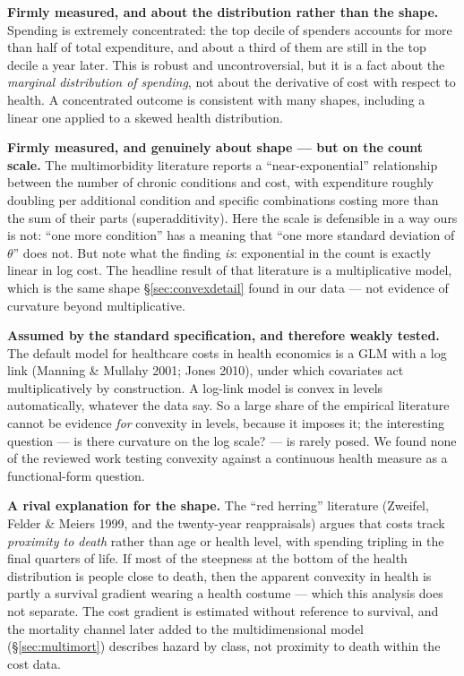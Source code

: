 \documentclass[11pt]{article}
\begin{document}
\textbf{Firmly measured, and about the distribution rather than the shape.}
Spending is extremely concentrated: the top decile of spenders accounts for
more than half of total expenditure, and about a third of them are still in
the top decile a year later. This is robust and uncontroversial, but it is a
fact about the \emph{marginal distribution of spending}, not about the
derivative of cost with respect to health. A concentrated outcome is
consistent with many shapes, including a linear one applied to a skewed
health distribution.

\textbf{Firmly measured, and genuinely about shape --- but on the count
scale.} The multimorbidity literature reports a ``near-exponential''
relationship between the number of chronic conditions and cost, with
expenditure roughly doubling per additional condition and specific
combinations costing more than the sum of their parts (superadditivity).
Here the scale is defensible in a way ours is not: ``one more condition'' has
a meaning that ``one more standard deviation of $\theta$'' does not. But note
what the finding \emph{is}: exponential in the count is exactly linear in log
cost. The headline result of that literature is a multiplicative model, which
is the same shape \S\ref{sec:convexdetail} found in our data --- not evidence
of curvature beyond multiplicative.

\textbf{Assumed by the standard specification, and therefore weakly tested.}
The default model for healthcare costs in health economics is a GLM with a
log link (Manning \& Mullahy 2001; Jones 2010), under which covariates act
multiplicatively by construction. A log-link model is convex in levels
automatically, whatever the data say. So a large share of the empirical
literature cannot be evidence \emph{for} convexity in levels, because it
imposes it; the interesting question --- is there curvature on the log scale?
--- is rarely posed. We found none of the reviewed work testing convexity
against a continuous health measure as a functional-form question.

\textbf{A rival explanation for the shape.} The ``red herring'' literature
(Zweifel, Felder \& Meiers 1999, and the twenty-year reappraisals) argues
that costs track \emph{proximity to death} rather than age or health level,
with spending tripling in the final quarters of life. If most of the
steepness at the bottom of the health distribution is people close to death,
then the apparent convexity in health is partly a survival gradient wearing a
health costume --- which this analysis does not separate. The cost gradient
is estimated without reference to survival, and the mortality channel later
added to the multidimensional model (\S\ref{sec:multimort}) describes hazard
by class, not proximity to death within the cost data.
\end{document}
